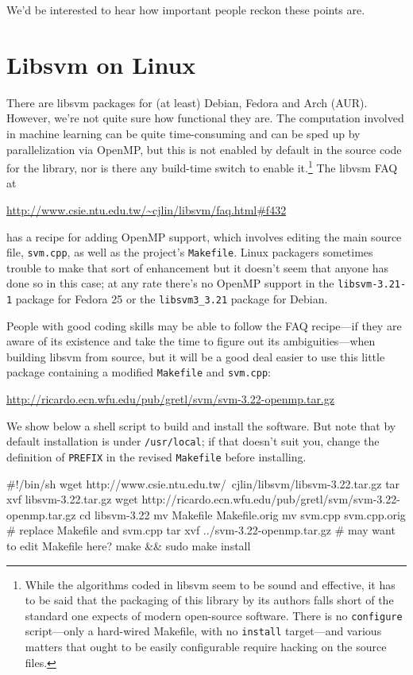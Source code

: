 \documentclass{article}
\begin{document}
We'd be interested to hear how important people reckon these points
are.

\section{Libsvm on Linux}
\label{sec:linux}

There are \textsf{libsvm} packages for (at least) Debian, Fedora and
Arch (AUR). However, we're not quite sure how functional they are. The
computation involved in machine learning can be quite time-consuming
and can be sped up by parallelization via \textsf{OpenMP},
but this is not enabled by default in the source code for the library,
nor is there any build-time switch to enable it.\footnote{While the
  algorithms coded in \textsf{libsvm} seem to be sound and effective,
  it has to be said that the packaging of this library by its authors
  falls short of the standard one expects of modern open-source
  software. There is no \texttt{configure} script---only a hard-wired
  Makefile, with no \texttt{install} target---and various matters that
  ought to be easily configurable require hacking on the source
  files.}  The \textsf{libvsm} FAQ at

\url{http://www.csie.ntu.edu.tw/~cjlin/libsvm/faq.html#f432}

has a recipe for adding \textsf{OpenMP} support, which involves
editing the main source file, \texttt{svm.cpp}, as well as the
project's \texttt{Makefile}. Linux packagers sometimes trouble to
make that sort of enhancement but it doesn't seem that anyone has done
so in this case; at any rate there's no \textsf{OpenMP} support in the
\texttt{libsvm-3.21-1} package for Fedora 25 or the
\texttt{libsvm3\_3.21} package for Debian.

People with good coding skills may be able to follow the FAQ
recipe---if they are aware of its existence and take the time to
figure out its ambiguities---when building \textsf{libsvm} from
source, but it will be a good deal easier to use this little package
containing a modified \texttt{Makefile} and \texttt{svm.cpp}:

\url{http://ricardo.ecn.wfu.edu/pub/gretl/svm/svm-3.22-openmp.tar.gz}

We show below a shell script to build and install the software. But
note that by default installation is under \texttt{/usr/local}; if
that doesn't suit you, change the definition of \texttt{PREFIX} in the
revised \texttt{Makefile} before installing.
\begin{code}
#!/bin/sh
wget http://www.csie.ntu.edu.tw/~cjlin/libsvm/libsvm-3.22.tar.gz
tar xvf libsvm-3.22.tar.gz
wget http://ricardo.ecn.wfu.edu/pub/gretl/svm/svm-3.22-openmp.tar.gz
cd libsvm-3.22
mv Makefile Makefile.orig
mv svm.cpp svm.cpp.orig
# replace Makefile and svm.cpp
tar xvf ../svm-3.22-openmp.tar.gz
# may want to edit Makefile here?
make && sudo make install
\end{code}
\end{document}
